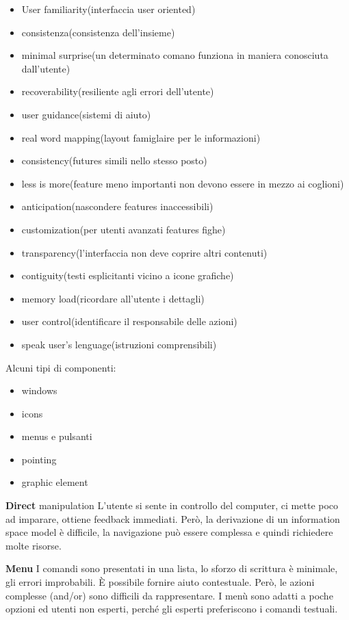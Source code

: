 \documentclass{article}
\begin{document}
\begin{itemize}
    \item User familiarity(interfaccia user oriented)
    \item consistenza(consistenza dell'insieme)
    \item minimal surprise(un determinato comano funziona in maniera conosciuta dall'utente)
    \item recoverability(resiliente agli errori dell'utente)
    \item user guidance(sistemi di aiuto)
    \item real word mapping(layout famiglaire per le informazioni)
    \item consistency(futures simili nello stesso posto)
    \item less is more(feature meno importanti non devono essere in mezzo ai coglioni)
    \item anticipation(nascondere features inaccessibili)
    \item customization(per utenti avanzati features fighe)
    \item transparency(l'interfaccia non deve coprire altri contenuti)
    \item contiguity(testi esplicitanti vicino a icone grafiche)
    \item memory load(ricordare all'utente i dettagli)
    \item user control(identificare il responsabile delle azioni)
    \item speak user's lenguage(istruzioni comprensibili)
\end{itemize}

Alcuni tipi di componenti:
\begin{itemize}
    \item windows
    \item icons
    \item menus e pulsanti
    \item pointing
    \item graphic element
\end{itemize}

\textbf{Direct} manipulation L'utente si sente in controllo del computer, ci mette poco ad imparare, ottiene
feedback immediati. Però, la derivazione di un information space model è difficile, la navigazione può
essere complessa e quindi richiedere molte risorse.

\textbf{Menu} I comandi sono presentati in una lista, lo sforzo di scrittura è minimale, gli errori improbabili.
È possibile fornire aiuto contestuale. Però, le azioni complesse (and/or) sono difficili da rappresentare. I
menù sono adatti a poche opzioni ed utenti non esperti, perché gli esperti preferiscono i comandi testuali.
\end{document}
